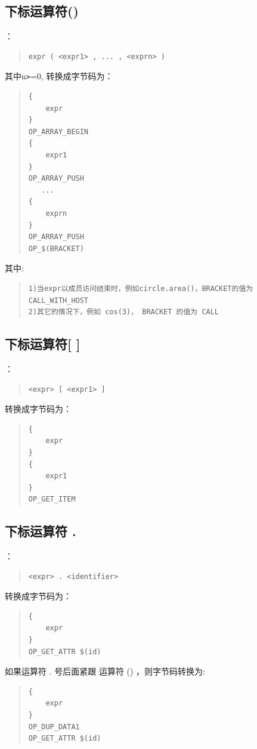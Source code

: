 \subsection{下标运算符()}
：
\begin{quote}
\begin{verbatim}
expr ( <expr1> , ... , <exprn> )  
\end{verbatim}
\end{quote}
其中n\verb|>|=0, 转换成字节码为：
\begin{quote}
\begin{verbatim}
{
    expr
}
OP_ARRAY_BEGIN
{
    expr1
}
OP_ARRAY_PUSH
   ...
{
    exprn
}
OP_ARRAY_PUSH
OP_$(BRACKET)
\end{verbatim}
\end{quote}
其中:
\begin{quote}
\begin{verbatim}
1)当expr以成员访问结束时，例如circle.area()，BRACKET的值为CALL_WITH_HOST
2)其它的情况下，例如 cos(3)， BRACKET 的值为 CALL
\end{verbatim}
\end{quote}
\subsection{下标运算符[ ]}
：
\begin{quote}
\begin{verbatim}
<expr> [ <expr1> ]
\end{verbatim}
\end{quote}
转换成字节码为：
\begin{quote}
\begin{verbatim}
{
    expr
}
{
    expr1
}
OP_GET_ITEM
\end{verbatim}
\end{quote}

\subsection{下标运算符 . }
：
\begin{quote}
\begin{verbatim}
<expr> . <identifier>
\end{verbatim}
\end{quote}
转换成字节码为：
\begin{quote}
\begin{verbatim}
{
    expr
}
OP_GET_ATTR $(id)
\end{verbatim}
\end{quote}
如果运算符 . 号后面紧跟 运算符 () ，则字节码转换为:
\begin{quote}
\begin{verbatim}
{
    expr
}
OP_DUP_DATA1
OP_GET_ATTR $(id)
\end{verbatim}
\end{quote}

